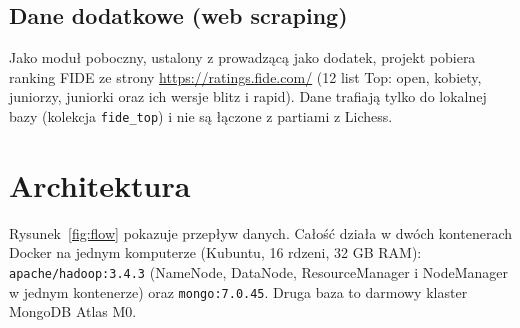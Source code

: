 \documentclass[11pt,a4paper]{article}
\newcommand{\kod}[1]{\texttt{#1}}
\begin{document}
\subsection{Dane dodatkowe (web scraping)}
Jako moduł poboczny, ustalony z prowadzącą jako dodatek, projekt pobiera ranking FIDE ze strony \url{https://ratings.fide.com/} (12 list Top: open, kobiety, juniorzy, juniorki oraz ich wersje blitz i rapid). Dane trafiają tylko do lokalnej bazy (kolekcja \kod{fide\_top}) i nie są łączone z partiami z Lichess.

\section{Architektura}
Rysunek~\ref{fig:flow} pokazuje przepływ danych. Całość działa w dwóch kontenerach Docker na jednym komputerze (Kubuntu, 16 rdzeni, 32 GB RAM): \kod{apache/hadoop:3.4.3} (NameNode, DataNode, ResourceManager i NodeManager w jednym kontenerze) oraz \kod{mongo:7.0.45}. Druga baza to darmowy klaster MongoDB Atlas M0.
\end{document}
